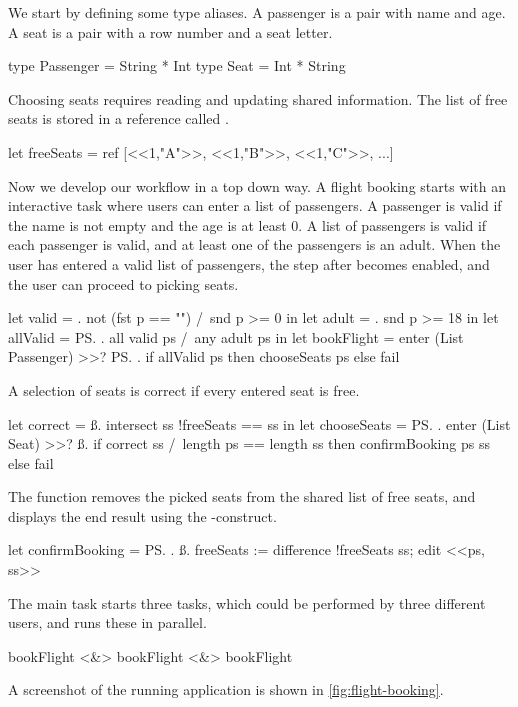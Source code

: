 \begin{example}
\label{exm:flight-booking}

We start by defining some type aliases.
A passenger is a pair with name and age.
A seat is a pair with a row number and a seat letter.
\begin{TASK}
  type Passenger = String * Int
  type Seat = Int * String
\end{TASK}

Choosing seats requires reading and updating shared information.
The list of free seats is stored in a reference called .
\begin{TASK}
  let freeSeats = ref [<<1,"A">>, <<1,"B">>, <<1,"C">>, ...]
\end{TASK}

Now we develop our workflow in a top down way.
A flight booking starts with an interactive task 
where users can enter a list of passengers.
A passenger is valid if the name is not empty and the age is at least 0.
A list of passengers is valid if each passenger is valid, and at least one of the passengers is an adult.
When the user has entered a valid list of passengers, the step after  becomes enabled,
and the user can proceed to picking seats.
\begin{TASK}
  let valid = \p. not (fst p == "") /\ snd p >= 0 in
  let adult = \p. snd p >= 18 in
  let allValid = \ps. all valid ps /\ any adult ps in
  let bookFlight = enter (List Passenger) >>? \ps.
    if allValid ps then chooseSeats ps else fail
\end{TASK}
A selection of seats is correct if every entered seat is free.
\begin{TASK}
  let correct = \ss. intersect ss !freeSeats == ss in
  let chooseSeats = \ps. enter (List Seat) >>? \ss.
    if correct ss /\ length ps == length ss
      then confirmBooking ps ss else fail
\end{TASK}
The function  removes the picked seats from the shared list of free seats,
and displays the end result using the -construct.
\begin{TASK}
  let confirmBooking = \ps. \ss.
    freeSeats := difference !freeSeats ss; edit <<ps, ss>>
\end{TASK}

The main task starts three  tasks,
which could be performed by three different users,
and runs these in parallel.
\begin{TASK}
  bookFlight <&> bookFlight <&> bookFlight
\end{TASK}
A screenshot of the running application is shown in \cref{fig:flight-booking}.


\end{example}
